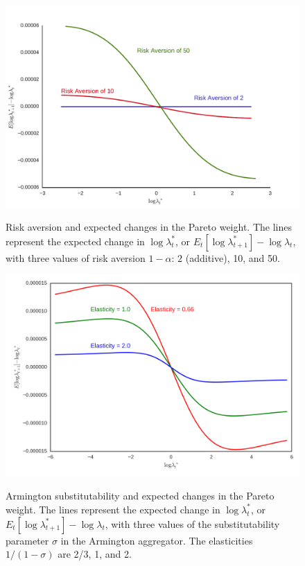 \clearpage
\begin{figure}[htb]
\caption{Risk aversion and expected changes in the Pareto weight.
The lines represent the expected change in $\log \lambda_t^*$, or $E_t[\log \lambda^*_{t+1}] - \log \lambda_t$,
with three values of risk aversion $1-\alpha$:
$2$ (additive), 10, and 50. }

\includegraphics[width=\textwidth]{images/BCFL/policy_at_ss_one_axis.pdf}
\label{fig:change-pareto-weight-ra}
\end{figure}


\clearpage
\begin{figure}[htb]
\caption{Armington substitutability and expected changes in the Pareto weight.
The lines represent the expected change in $\log \lambda_t^*$, or $E_t[\log \lambda^*_{t+1}] - \log \lambda_t$,
with three values of the substitutability parameter $\sigma$ in the Armington aggregator.
The elasticities $1/(1-\sigma)$ are 2/3, 1, and 2. }

\bigskip
\includegraphics[width=\textwidth]{images/BCFL/Policies_Diff_Elast.png}
\label{fig:change-pareto-weight-arm}
\end{figure}

